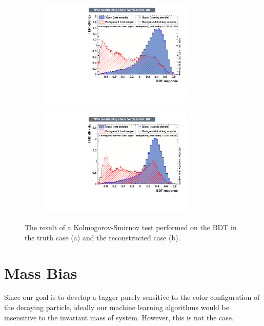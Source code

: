 \documentclass[10pt,a4paper]{book}
\begin{document}
\begin{figure}[h]
\begin{subfigure}{1.0\textwidth}
\centering
\includegraphics[width=0.8\textwidth]{ch4_images/ks_bdt_truth}
\caption{}
\end{subfigure}
\begin{subfigure}{1.0\textwidth}
\centering
\includegraphics[width=0.8\textwidth]{ch4_images/ks_bdt_reco}
\caption{}
\end{subfigure}
\caption{The result of a Kolmogorov-Smirnov test performed on the BDT in the truth case (a) and the reconstructed case (b).}
\label{kolmogorov smirnov bdt}
\end{figure} 


\section{Mass Bias}

Since our goal is to develop a tagger purely sensitive to the color configuration of the decaying particle, ideally our machine learning algorithms would be insensitive to the invariant mass of system. However, this is not the case.
\end{document}

